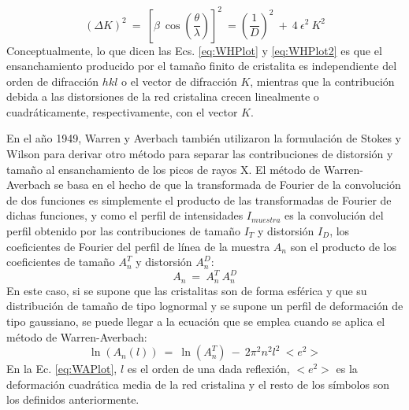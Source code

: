  \begin{equation}
  (\Delta K)^2 \ = \ \left[\beta \ \cos\left(\frac{\theta}{\lambda}\right)\right]^2 \ = \left(\frac{1}{D}\right)^2 \ + \ 4 \ \epsilon^2 \ K^2
  \label{eq:WHPlot2}
\end{equation}
\noindent
Conceptualmente, lo que dicen las Ecs. \ref{eq:WHPlot} y \ref{eq:WHPlot2} es que el ensanchamiento producido por el tamaño finito de cristalita es independiente del orden de difracción $hkl$ o el vector de difracción $K$, mientras que la contribución debida a las  distorsiones de la red cristalina crecen linealmente o cuadráticamente, respectivamente, con el vector $K$.

En el año 1949, Warren y Averbach\cite{WarrenAverbach1949} también utilizaron la formulación de Stokes y Wilson para derivar otro método para separar las contribuciones de distorsión y tamaño al ensanchamiento de los picos de rayos X. 
El método de Warren-Averbach se basa en el hecho de que la transformada de Fourier de la convolución de dos funciones es simplemente el producto de las transformadas de Fourier de dichas funciones, y como el perfil de intensidades $I_{muestra}$ es la convolución del perfil obtenido por las contribuciones de tamaño $I_{T}$ y distorsión $I_{D}$, los coeficientes de Fourier del perfil de línea de la muestra $A_n$ son el producto de los coeficientes de tamaño $A_n^T$ y distorsión $A_n^D$:
\begin{equation}
  A_n \ = \ A_n^T \ A_n^D
  \label{eq:FCoeff}
 \end{equation}
\noindent
En este caso, si se supone que las cristalitas son de forma esférica y que su distribución de tamaño de tipo lognormal\cite{WikiLognormal} y se supone un perfil de deformación de tipo gaussiano, se puede llegar a la ecuación que se emplea cuando se aplica el método de Warren-Averbach:
\begin{equation}
  \ln(A_n(l)) \ = \ \ln(A_n^T) \ - \ 2 \pi^2 n^2 l^2 \ <e^2>
  \label{eq:WAPlot}
 \end{equation}
\noindent
En la Ec. \ref{eq:WAPlot}, $l$ es el orden de una dada reflexión, $<e^2>$ es la deformación cuadrática media de la red cristalina y el resto de los símbolos son los definidos anteriormente.


